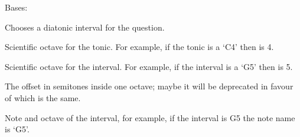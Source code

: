 \documentclass[letterpaper,10pt,english]{sphinxmanual}
\begin{document}
\begin{fulllineitems}
\label{\detokenize{birdears:birdears.interval.ChromaticInterval}}
Bases: {\hyperref[\detokenize{index:birdears.interval.IntervalBase}]{}}

Chooses a diatonic interval for the question.

\begin{fulllineitems}
\label{\detokenize{birdears:birdears.interval.ChromaticInterval.tonic_octave}}
 \textendash{} Scientific octave for the tonic. For example, if
the tonic is a ‘C4’ then  is 4.

\end{fulllineitems}



\begin{fulllineitems}
 \textendash{} Scientific octave for the interval. For example,
if the interval is a ‘G5’ then  is 5.

\end{fulllineitems}


\begin{fulllineitems}
\label{\detokenize{birdears:birdears.interval.ChromaticInterval.chromatic_offset}}
 \textendash{} The offset in semitones inside one octave;
maybe it will be deprecated in favour of 
which is the same.

\end{fulllineitems}


\begin{fulllineitems}
\label{\detokenize{birdears:birdears.interval.ChromaticInterval.note_and_octave}}
 \textendash{} Note and octave of the interval, for example, if
the interval is G5 the note name is ‘G5’.


\end{fulllineitems}
\end{fulllineitems}
\end{document}
